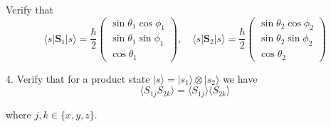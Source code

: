 Verify that
\begin{equation*}
\langle s|\mathbf S_1|s\rangle
=\frac{\hbar}{2}\begin{pmatrix}
\sin\theta_1\cos\phi_1\\
\sin\theta_1\sin\phi_1\\
\cos\theta_1
\end{pmatrix},\quad
\langle s|\mathbf S_2|s\rangle
=\frac{\hbar}{2}\begin{pmatrix}
\sin\theta_2\cos\phi_2\\
\sin\theta_2\sin\phi_2\\
\cos\theta_2
\end{pmatrix}
\end{equation*}

4. Verify that for a product state $|s\rangle=|s_1\rangle\otimes|s_2\rangle$ we have
\begin{equation*}
\langle S_{1j}S_{2k}\rangle=\langle S_{1j}\rangle\langle S_{2k}\rangle
\end{equation*}

where $j,k\in\{x,y,z\}$.


